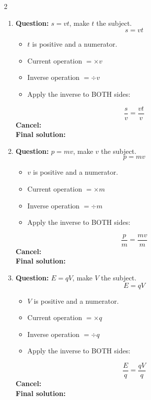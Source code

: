 \documentclass[11pt]{article}
\begin{document}
\begin{multicols}{2}
\begin{enumerate}[leftmargin=*, itemsep=10pt]
\newpage
\item \textbf{Question:} \( s = vt \), make \( t \) the subject.
\[
s=vt
\]
\begin{itemize}[leftmargin=*, itemsep=2pt]
\item \(t\) is positive and a numerator.
\item Current operation \(= \times v\)
\item Inverse operation \(= \div v\)
\item Apply the inverse to BOTH sides:
\end{itemize}
\[
\frac{s}{v}=\frac{vt}{v}
\]
\textbf{Cancel:} \\[1.5cm]
\textbf{Final solution:}\\[1.5cm]

\item \textbf{Question:} \( p = mv \), make \( v \) the subject.
\[
p=mv
\]
\begin{itemize}[leftmargin=*, itemsep=2pt]
\item \(v\) is positive and a numerator.
\item Current operation \(= \times m\)
\item Inverse operation \(= \div m\)
\item Apply the inverse to BOTH sides:
\end{itemize}
\[
\frac{p}{m}=\frac{mv}{m}
\]
\textbf{Cancel:} \\[1.5cm]
\textbf{Final solution:}\\[1.5cm]

\columnbreak
\item \textbf{Question:} \( E = qV \), make \( V \) the subject.
\[
E=qV
\]
\begin{itemize}[leftmargin=*, itemsep=2pt]
\item \(V\) is positive and a numerator.
\item Current operation \(= \times q\)
\item Inverse operation \(= \div q\)
\item Apply the inverse to BOTH sides:
\end{itemize}
\[
\frac{E}{q}=\frac{qV}{q}
\]
\textbf{Cancel:} \\[1.5cm]
\textbf{Final solution:}\\[1.5cm]


\end{enumerate}
\end{multicols}
\end{document}
